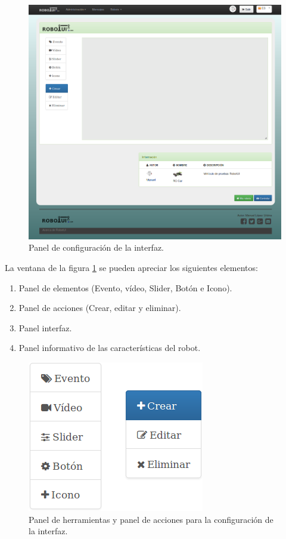\begin{figure}[H]
  \begin{center}
    \includegraphics[scale=0.4]{imagenes/manual-usuario/pagina-configurar-interfaz.png}
  \end{center}
  \caption{Panel de configuración de la interfaz.}
  \label{website:configuracion-interfaz}
\end{figure}

La ventana de la figura \ref{website:configuracion-interfaz} se pueden apreciar los siguientes elementos:

\begin{enumerate}
  \item Panel de elementos (Evento, vídeo, Slider, Botón e Icono).
 \item Panel de acciones (Crear, editar y eliminar).
 \item Panel interfaz.
 \item Panel informativo de las características del robot.
\end{enumerate}


\begin{figure}[H]
  \begin{center}
    \includegraphics[scale=.6]{imagenes/manual-usuario/barra-herramientas-interfaz.png}
  \end{center}
  \caption{Panel de herramientas  y panel de acciones para la configuración de la interfaz.}
  \label{website:pagina-principal}
\end{figure}


